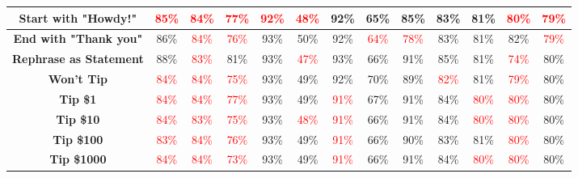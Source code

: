 \documentclass[11pt, dvipsnames]{article}
\begin{document}
\begin{table}
\begin{tabular}{|c|c|c|c|c|c|c|c|c|c|c|c||c|}
		\hline
		\textbf{\textcolor{Perturbations}{Start with "Howdy!"}} & \textcolor{red}{85\%} & \textcolor{red}{84\%} & \textcolor{red}{77\%} & \textcolor{red}{92\%} & \textcolor{red}{48\%} &     92\% &     65\% & \textcolor{happygreen}{85\%} &     83\% &     81\% & \textcolor{red}{80\%} & \textcolor{red}{79\%}\\
		\hline
		\textbf{\textcolor{Perturbations}{End with "Thank you"}} &     86\% & \textcolor{red}{84\%} & \textcolor{red}{76\%} &     93\% & \textcolor{happygreen}{50\%} &     92\% & \textcolor{red}{64\%} & \textcolor{red}{78\%} &     83\% &     81\% & \textcolor{happygreen}{82\%} & \textcolor{red}{79\%}\\
		\hline
		\textbf{\textcolor{Perturbations}{Rephrase as Statement}} & \textcolor{happygreen}{88\%} & \textcolor{red}{83\%} & \textcolor{happygreen}{81\%} &     93\% & \textcolor{red}{47\%} & \textcolor{happygreen}{93\%} & \textcolor{happygreen}{66\%} & \textcolor{happygreen}{91\%} & \textcolor{happygreen}{85\%} &     81\% & \textcolor{red}{74\%} &     80\%\\
		\hline
		\textbf{\textcolor{Tipping}{Won't Tip}} & \textcolor{red}{84\%} & \textcolor{red}{84\%} & \textcolor{red}{75\%} &     93\% &     49\% &     92\% & \textcolor{happygreen}{70\%} & \textcolor{happygreen}{89\%} & \textcolor{red}{82\%} &     81\% & \textcolor{red}{79\%} &     80\%\\
		\hline
		\textbf{\textcolor{Tipping}{Tip \$1}} & \textcolor{red}{84\%} & \textcolor{red}{84\%} & \textcolor{red}{77\%} &     93\% &     49\% & \textcolor{red}{91\%} & \textcolor{happygreen}{67\%} & \textcolor{happygreen}{91\%} & \textcolor{happygreen}{84\%} & \textcolor{red}{80\%} & \textcolor{red}{80\%} &     80\%\\
		\hline
		\textbf{\textcolor{Tipping}{Tip \$10}} & \textcolor{red}{84\%} & \textcolor{red}{83\%} & \textcolor{red}{75\%} &     93\% & \textcolor{red}{48\%} & \textcolor{red}{91\%} & \textcolor{happygreen}{66\%} & \textcolor{happygreen}{91\%} & \textcolor{happygreen}{84\%} & \textcolor{red}{80\%} & \textcolor{red}{80\%} &     80\%\\
		\hline
		\textbf{\textcolor{Tipping}{Tip \$100}} & \textcolor{red}{83\%} & \textcolor{red}{84\%} & \textcolor{red}{76\%} &     93\% &     49\% & \textcolor{red}{91\%} & \textcolor{happygreen}{66\%} & \textcolor{happygreen}{90\%} &     83\% &     81\% & \textcolor{red}{80\%} &     80\%\\
		\hline
		\textbf{\textcolor{Tipping}{Tip \$1000}} & \textcolor{red}{84\%} & \textcolor{red}{84\%} & \textcolor{red}{73\%} &     93\% &     49\% & \textcolor{red}{91\%} & \textcolor{happygreen}{66\%} & \textcolor{happygreen}{91\%} & \textcolor{happygreen}{84\%} & \textcolor{red}{80\%} & \textcolor{red}{80\%} &     80\%\\

\end{tabular}
\end{table}
\end{document}
